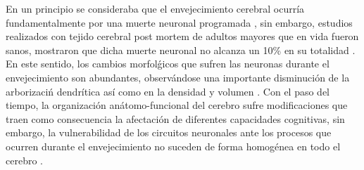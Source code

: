 


En un principio se consideraba que el envejecimiento cerebral ocurr\'ia fundamentalmente por una 
muerte neuronal programada \cite{Coleman87}, sin embargo, estudios realizados con tejido cerebral 
post mortem de adultos mayores que en vida fueron sanos, mostraron que dicha muerte neuronal no 
alcanza un 10\% en su totalidad \cite{Esiri07}. 
En este sentido, los cambios morfol\'gicos que 
sufren las neuronas durante el envejecimiento son abundantes, observ\'andose una importante 
disminuci\'on de la arborizaci\'n dendr\'itica as\'i como en la densidad y volumen \cite{Hita14}. 
Con el paso del tiempo, la organizaci\'on an\'atomo-funcional del cerebro sufre modificaciones 
que traen como consecuencia la afectaci\'on de diferentes capacidades cognitivas, 
sin embargo, 
la vulnerabilidad de los circuitos neuronales ante los procesos que ocurren durante el 
envejecimiento no suceden de forma homog\'enea en todo el cerebro \cite{Hita14}.


